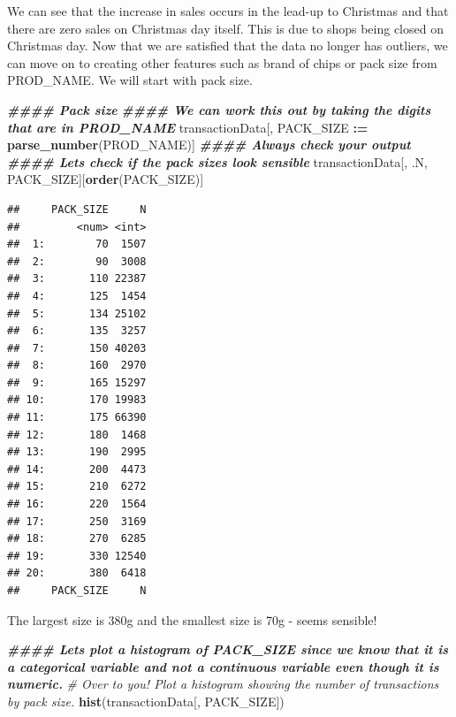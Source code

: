 \documentclass[
]{article}
\newenvironment{Shaded}{\begin{snugshade}}{\end{snugshade}}
\newcommand{\CommentTok}[1]{\textcolor[rgb]{0.56,0.35,0.01}{\textit{#1}}}
\newcommand{\DocumentationTok}[1]{\textcolor[rgb]{0.56,0.35,0.01}{\textbf{\textit{#1}}}}
\newcommand{\FunctionTok}[1]{\textcolor[rgb]{0.13,0.29,0.53}{\textbf{#1}}}
\newcommand{\NormalTok}[1]{#1}
\newcommand{\SpecialCharTok}[1]{\textcolor[rgb]{0.81,0.36,0.00}{\textbf{#1}}}
\begin{document}
We can see that the increase in sales occurs in the lead-up to Christmas
and that there are zero sales on Christmas day itself. This is due to
shops being closed on Christmas day. Now that we are satisfied that the
data no longer has outliers, we can move on to creating other features
such as brand of chips or pack size from PROD\_NAME. We will start with
pack size.

\begin{Shaded}
\begin{Highlighting}[]
\DocumentationTok{\#\#\#\# Pack size}
\DocumentationTok{\#\#\#\# We can work this out by taking the digits that are in PROD\_NAME}
\NormalTok{transactionData[, PACK\_SIZE }\SpecialCharTok{:=} \FunctionTok{parse\_number}\NormalTok{(PROD\_NAME)]}
\DocumentationTok{\#\#\#\# Always check your output}
\DocumentationTok{\#\#\#\# Let\textquotesingle{}s check if the pack sizes look sensible}
\NormalTok{transactionData[, .N, PACK\_SIZE][}\FunctionTok{order}\NormalTok{(PACK\_SIZE)]}
\end{Highlighting}
\end{Shaded}

\begin{verbatim}
##     PACK_SIZE     N
##         <num> <int>
##  1:        70  1507
##  2:        90  3008
##  3:       110 22387
##  4:       125  1454
##  5:       134 25102
##  6:       135  3257
##  7:       150 40203
##  8:       160  2970
##  9:       165 15297
## 10:       170 19983
## 11:       175 66390
## 12:       180  1468
## 13:       190  2995
## 14:       200  4473
## 15:       210  6272
## 16:       220  1564
## 17:       250  3169
## 18:       270  6285
## 19:       330 12540
## 20:       380  6418
##     PACK_SIZE     N
\end{verbatim}

The largest size is 380g and the smallest size is 70g - seems sensible!

\begin{Shaded}
\begin{Highlighting}[]
\DocumentationTok{\#\#\#\# Let\textquotesingle{}s plot a histogram of PACK\_SIZE since we know that it is a categorical variable and not a continuous variable even though it is numeric.}
\CommentTok{\# Over to you! Plot a histogram showing the number of transactions by pack size.}
\FunctionTok{hist}\NormalTok{(transactionData[, PACK\_SIZE])}
\end{Highlighting}
\end{Shaded}
\end{document}
